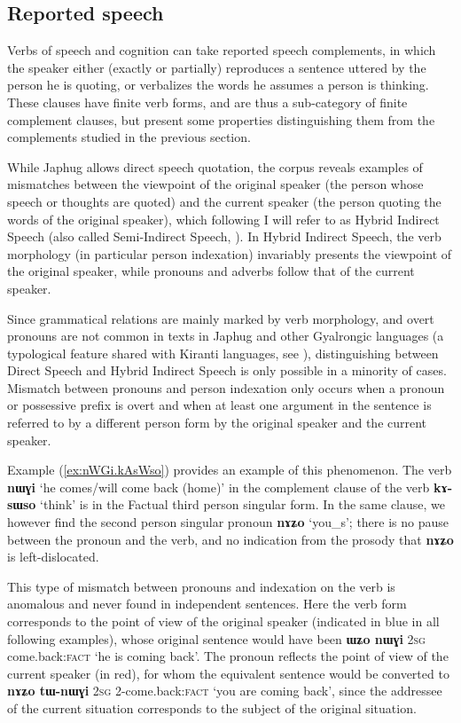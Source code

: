 \documentclass[oneside,a4paper,11pt]{article}
\newcommand{\ipa}[1]{\textbf{\phon#1}} %
\newcommand{\refb}[1]{(\ref{#1})}
\begin{document}
\subsection{Reported speech} \label{sec:reported}
Verbs of speech and cognition can take reported speech complements, in which the speaker either (exactly or partially) reproduces a sentence uttered by the person he is quoting, or verbalizes the words he assumes a person is thinking. These clauses have finite verb forms, and are thus a sub-category of finite complement clauses, but present some properties distinguishing them from the complements studied in the previous section.

While Japhug allows direct speech quotation, the corpus reveals examples of mismatches between the viewpoint of the original speaker (the person whose speech or thoughts are quoted) and the current speaker (the person quoting the words of the original speaker), which following \citet{tournadre08conjunct} I will refer to as Hybrid Indirect Speech (also called Semi-Indirect Speech, \citet{aikhenvald08semidirect}). In Hybrid Indirect Speech, the verb morphology (in particular person indexation) invariably presents the viewpoint of the original speaker, while pronouns and adverbs follow that of the current speaker.

Since grammatical relations are mainly marked by verb morphology, and overt pronouns 
are not common in texts in Japhug and other Gyalrongic languages (a typological feature shared with Kiranti languages, see \citealt{bickel01deictic}), distinguishing between Direct Speech and Hybrid Indirect Speech is only possible in a minority of cases. Mismatch between pronouns and person indexation only occurs when a pronoun or possessive prefix is overt and when at least one argument in the sentence is referred to by a different person form by the original speaker and the current speaker. 

Example \refb{ex:nWGi.kAsWso} provides an example of this phenomenon. The verb \ipa{nɯɣi} `he comes/will come back (home)' in the complement clause of the verb \ipa{kɤ-sɯso} `think' is in the Factual third person singular form. In the same clause, we however find the second person singular pronoun \ipa{nɤʑo} `you_s'; there is no pause between the pronoun and the verb, and no indication from the prosody that \ipa{nɤʑo} is left-dislocated. 

This type of mismatch between pronouns and indexation on the verb is anomalous and never found in independent sentences. Here the verb form corresponds to the point of view of the original speaker (indicated in blue in all following examples), whose original sentence would have been \ipa{ɯʑo nɯɣi} \textsc{2sg} {come.back:\textsc{fact}} `he is coming back'. The pronoun reflects the point of view of the current speaker (in red), for whom the equivalent sentence would be converted to \ipa{nɤʑo tɯ-nɯɣi} \textsc{2sg} {2-come.back:\textsc{fact}} `you are coming back', since the addressee of the current situation corresponds to the subject of the original situation.
\end{document}
